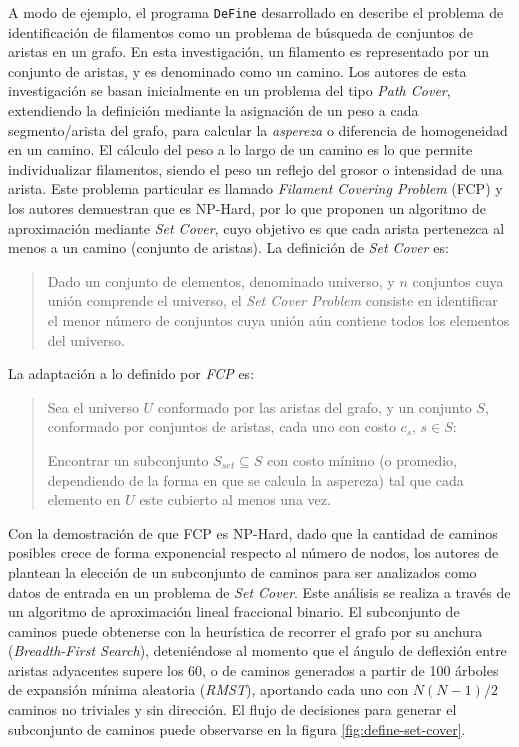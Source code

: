 A modo de ejemplo, el programa \texttt{DeFine} desarrollado en \cite{breuer2015define} describe el problema de identificaci\'on de filamentos como un problema de b\'usqueda de conjuntos de aristas en un grafo. En esta investigaci\'on, un filamento es representado por un conjunto de aristas, y es denominado como un camino. Los autores de esta investigaci\'on se basan inicialmente en un problema del tipo {\it Path Cover}, extendiendo la definici\'on mediante la asignaci\'on de un peso a cada segmento/arista del grafo, para calcular la {\it aspereza} o diferencia de homogeneidad en un camino. El c\'alculo del peso a lo largo de un camino es lo que permite individualizar filamentos, siendo el peso un reflejo del grosor o intensidad de una arista.
Este problema particular es llamado {\it Filament Covering Problem} (FCP) y los autores demuestran que es NP-Hard, por lo que proponen un algoritmo de aproximaci\'on mediante \textit{Set Cover}, cuyo objetivo es que cada arista pertenezca al menos a un camino (conjunto de aristas). La definici\'on de {\it Set Cover} es:

\begin{quote}
Dado un conjunto de elementos, denominado universo, y $n$ conjuntos cuya unión comprende el universo, el {\it Set Cover Problem} consiste en identificar el menor n\'umero de conjuntos cuya unión a\'un contiene todos los elementos del universo.
\end{quote}

La adaptaci\'on a lo definido por {\it FCP} es: 
\begin{quote}
Sea el universo $U$ conformado por las aristas del grafo, y un conjunto $S$, conformado por conjuntos de aristas, cada uno con costo $c_s$, $s \in S$:

Encontrar un subconjunto $S_{set} \subseteq S$ con costo m\'inimo (o promedio, dependiendo de la forma en que se calcula la aspereza) tal que cada elemento en $U$ este cubierto al menos una vez.
\end{quote}

Con la demostraci\'on de que FCP es NP-Hard, dado que la cantidad de caminos posibles crece de forma exponencial respecto al n\'umero de nodos, los autores de \cite{breuer2015define} plantean la elecci\'on de un subconjunto de caminos para ser analizados como datos de entrada en un problema de {\it Set Cover}. Este an\'alisis se realiza a trav\'es de un algoritmo de aproximaci\'on lineal fraccional binario. El subconjunto de caminos puede obtenerse con la heur\'istica de recorrer el grafo por su anchura ({\it Breadth-First Search}), deteni\'endose al momento que el \'angulo de deflexi\'on entre aristas adyacentes supere los 60\degree, o de caminos generados a partir de 100 \'arboles de expansi\'on m\'inima aleatoria ({\it RMST}), aportando cada uno con $N(N-1)/2$ caminos no triviales y sin direcci\'on. El flujo de decisiones para generar el subconjunto de caminos puede observarse en la figura \ref{fig:define-set-cover}.

